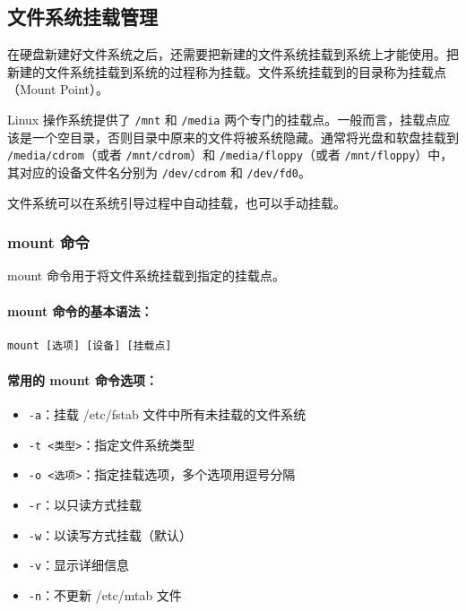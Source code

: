 \documentclass[12pt,UTF8]{ctexbook}
\begin{document}
\subsection{文件系统挂载管理}
\label{mount\_management}

在硬盘新建好文件系统之后，还需要把新建的文件系统挂载到系统上才能使用。把新建的文件系统挂载到系统的过程称为挂载。文件系统挂载到的目录称为挂载点（Mount Point）。

Linux 操作系统提供了 \texttt{/mnt} 和 \texttt{/media} 两个专门的挂载点。一般而言，挂载点应该是一个空目录，否则目录中原来的文件将被系统隐藏。通常将光盘和软盘挂载到 \texttt{/media/cdrom}（或者 \texttt{/mnt/cdrom}）和 \texttt{/media/floppy}（或者 \texttt{/mnt/floppy}）中，其对应的设备文件名分别为 \texttt{/dev/cdrom} 和 \texttt{/dev/fd0}。

文件系统可以在系统引导过程中自动挂载，也可以手动挂载。

\subsubsection{mount 命令}
mount 命令用于将文件系统挂载到指定的挂载点。

\paragraph{mount 命令的基本语法：}
\begin{verbatim}
mount [选项] [设备] [挂载点]
\end{verbatim}

\paragraph{常用的 mount 命令选项：}
\begin{itemize}
    \item \verb+-a+：挂载 /etc/fstab 文件中所有未挂载的文件系统
    \item \verb+-t <类型>+：指定文件系统类型
    \item \verb+-o <选项>+：指定挂载选项，多个选项用逗号分隔
    \item \verb+-r+：以只读方式挂载
    \item \verb+-w+：以读写方式挂载（默认）
    \item \verb+-v+：显示详细信息
    \item \verb+-n+：不更新 /etc/mtab 文件
\end{itemize}
\end{document}
